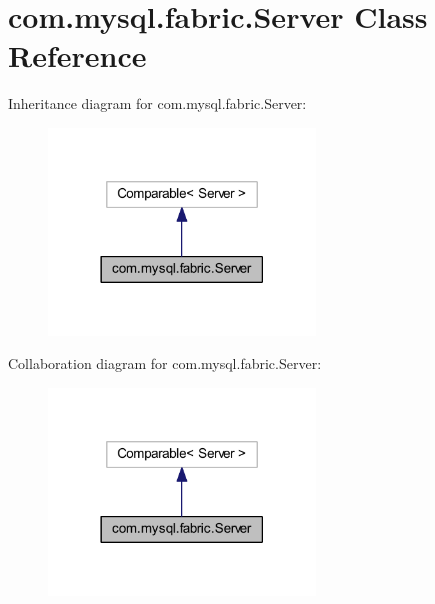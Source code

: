 \hypertarget{classcom_1_1mysql_1_1fabric_1_1_server}{}\section{com.\+mysql.\+fabric.\+Server Class Reference}
\label{classcom_1_1mysql_1_1fabric_1_1_server}


Inheritance diagram for com.\+mysql.\+fabric.\+Server\+:\nopagebreak
\begin{figure}[H]
\begin{center}
\leavevmode
\includegraphics[width=201pt]{classcom_1_1mysql_1_1fabric_1_1_server__inherit__graph}
\end{center}
\end{figure}


Collaboration diagram for com.\+mysql.\+fabric.\+Server\+:\nopagebreak
\begin{figure}[H]
\begin{center}
\leavevmode
\includegraphics[width=201pt]{classcom_1_1mysql_1_1fabric_1_1_server__coll__graph}
\end{center}
\end{figure}
